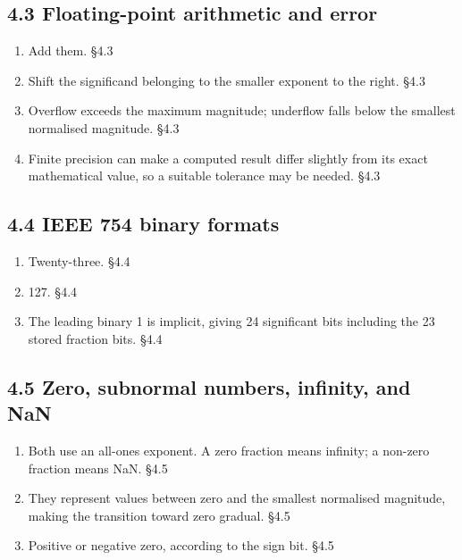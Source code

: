 \documentclass[11pt]{article}
\begin{document}
\begin{keepsection}\subsection{4.3 Floating-point arithmetic and error}

\begin{enumerate}
\item Add them. \hfill{\small\color{FAUblue}§4.3}
\item Shift the significand belonging to the smaller exponent to the right. \hfill{\small\color{FAUblue}§4.3}
\item Overflow exceeds the maximum magnitude; underflow falls below the smallest normalised magnitude. \hfill{\small\color{FAUblue}§4.3}
\item Finite precision can make a computed result differ slightly from its exact mathematical value, so a suitable tolerance may be needed. \hfill{\small\color{FAUblue}§4.3}
\end{enumerate}

\end{keepsection}
\begin{keepsection}\subsection{4.4 IEEE 754 binary formats}

\begin{enumerate}
\item Twenty-three. \hfill{\small\color{FAUblue}§4.4}
\item 127. \hfill{\small\color{FAUblue}§4.4}
\item The leading binary 1 is implicit, giving 24 significant bits including the 23 stored fraction bits. \hfill{\small\color{FAUblue}§4.4}
\end{enumerate}

\end{keepsection}
\begin{keepsection}\subsection{4.5 Zero, subnormal numbers, infinity, and NaN}

\begin{enumerate}
\item Both use an all-ones exponent. A zero fraction means infinity; a non-zero fraction means NaN. \hfill{\small\color{FAUblue}§4.5}
\item They represent values between zero and the smallest normalised magnitude, making the transition toward zero gradual. \hfill{\small\color{FAUblue}§4.5}
\item Positive or negative zero, according to the sign bit. \hfill{\small\color{FAUblue}§4.5}
\end{enumerate}

\end{keepsection}
\end{document}
